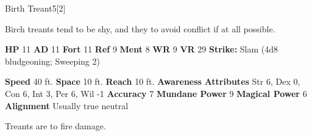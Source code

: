       

      
  \begin{monsubsection}{Birth Treant}{5}[2]
    \vspace{-1em}\vspace{-1em}
    \vspace{0em}

    
        Birch treants tend to be shy, and they to avoid conflict if at all possible.
      
    

    \begin{spellcontent}
      \begin{spelltargetinginfo}
        \pari \textbf{HP} 11 \monsep
          \textbf{AD} 11 \monsep
          \textbf{Fort} 11 \monsep
          \textbf{Ref} 9 \monsep
          \textbf{Ment} 8
        \pari \textbf{WR} 9 \monsep
        \textbf{VR} 29
        \pari \textbf{Strike:}
            Slam  (4d8 bludgeoning; Sweeping 2)
      \end{spelltargetinginfo}
    \end{spellcontent}
    \begin{monsterfooter}
      \pari \textbf{Speed} 40 ft. \monsep
        \textbf{Space} 10 ft. \monsep
        \textbf{Reach} 10 ft.
      \pari \textbf{Awareness} 
      \pari \textbf{Attributes}
        Str 6, Dex 0,
        Con 6, Int 3,
        Per 6, Wil -1
      \pari \textbf{Accuracy} 7 \monsep
        \textbf{Mundane Power} 9 \monsep
      \textbf{Magical Power} 6
      \pari \textbf{Alignment} Usually true neutral
    \end{monsterfooter}
  \end{monsubsection}
        Treants are  to fire damage.
      
